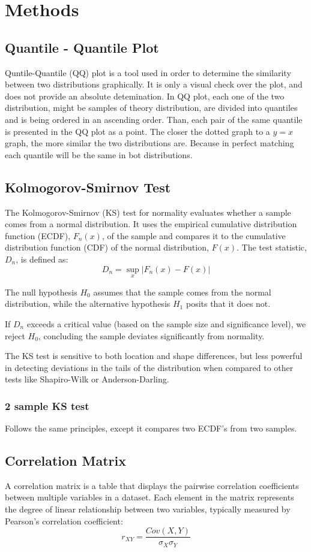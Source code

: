 \documentclass[conference]{IEEEtran}
\begin{document}
\section{Methods}
\subsection{Quantile - Quantile Plot}
Quntile-Quantile (QQ) plot is a tool used in order to determine the similarity between two distributions graphically. It is only a visual check over the plot, and does not provide an absolute detemination. In QQ plot, each one of the two distribution, might be samples of theory distribution, are divided into quantiles and is being ordered in an ascending order.  Than, each pair of the same quantile is presented in the QQ plot as a point. The closer the dotted graph to a $y=x$ graph, the more similar the two distributions are. Because in perfect matching each quantile will be the same in bot distributions.

\subsection{Kolmogorov-Smirnov Test}
The Kolmogorov-Smirnov (KS) test for normality evaluates whether a sample comes from a normal distribution. It uses the empirical cumulative distribution function (ECDF), $F_n(x)$, of the sample and compares it to the cumulative distribution function (CDF) of the normal distribution, $F(x)$. The test statistic, $D_n$, is defined as:
\[D_n = \sup_x |F_n(x) - F(x)|\]

The null hypothesis $H_0$ assumes that the sample comes from the normal distribution, while the alternative hypothesis $H_1$ posits that it does not.

    If $D_n$ exceeds a critical value (based on the sample size and significance level), we reject $H_0$, concluding the sample deviates significantly from normality.

The KS test is sensitive to both location and shape differences, but less powerful in detecting deviations in the tails of the distribution when compared to other tests like Shapiro-Wilk or Anderson-Darling.
\subsubsection*{2 sample KS test}
Follows the same principles, except it compares two ECDF's from two samples.
\subsection{Correlation Matrix}
A correlation matrix is a table that displays the pairwise correlation coefficients between multiple variables in a dataset. Each element in the matrix represents the degree of linear relationship between two variables, typically measured by Pearson's correlation coefficient:
\[r_{XY} = \frac{Cov(X,Y)}{\sigma_X\sigma_Y}\]
\end{document}
